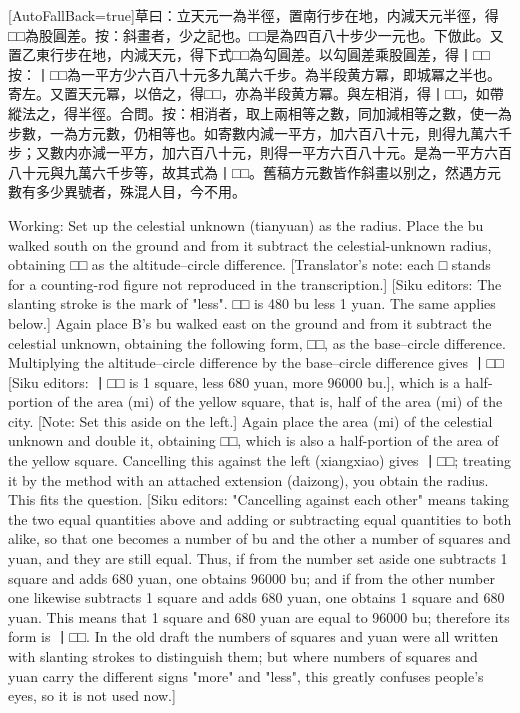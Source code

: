 \documentclass[11pt]{article}
\newcommand{\zhsmall}{\footnotesize\color{black!70}}
\newcommand{\unitlabel}[1]{\marginpar{\raggedleft\tiny\color{gray}#1}}
\newenvironment{unitzh}{\par\CJKfontspec{Noto Serif CJK SC}[AutoFallBack=true]\large\linespread{1.25}\selectfont}{\par}
\newenvironment{uniten}{\par\small\color{black!85}}{\par\medskip}
\begin{document}
\begin{unitzh}\unitlabel{ceyuan-007.13}草曰：立天元一為半徑，置南行步在地，内減天元半徑，得□□為股圓差。{\zhsmall 按：斜畫者，少之記也。□□是為四百八十步少一元也。下倣此。}又置乙東行步在地，内減天元，得下式□□為勾圓差。以勾圓差乘股圓差，得丨□□{\zhsmall 按：丨□□為一平方少六百八十元多九萬六千步。}為半段黄方冪，即城冪之半也。{\zhsmall 寄左。}又置天元冪，以倍之，得□□，亦為半段黄方冪。與左相消，得丨□□，如帶縱法之，得半徑。合問。{\zhsmall 按：相消者，取上兩相等之數，同加減相等之數，使一為步數，一為方元數，仍相等也。如寄數内減一平方，加六百八十元，則得九萬六千步；又數内亦減一平方，加六百八十元，則得一平方六百八十元。是為一平方六百八十元與九萬六千步等，故其式為丨□□。舊稿方元數皆作斜畫以别之，然遇方元數有多少異號者，殊混人目，今不用。}\end{unitzh}
\begin{uniten}Working: Set up the celestial unknown (tianyuan) as the radius. Place the bu walked south on the ground and from it subtract the celestial-unknown radius, obtaining □□ as the altitude–circle difference. [Translator's note: each □ stands for a counting-rod figure not reproduced in the transcription.] [Siku editors: The slanting stroke is the mark of "less". □□ is 480 bu less 1 yuan. The same applies below.] Again place B's bu walked east on the ground and from it subtract the celestial unknown, obtaining the following form, □□, as the base–circle difference. Multiplying the altitude–circle difference by the base–circle difference gives 丨□□ [Siku editors: 丨□□ is 1 square, less 680 yuan, more 96000 bu.], which is a half-portion of the area (mi) of the yellow square, that is, half of the area (mi) of the city. [Note: Set this aside on the left.] Again place the area (mi) of the celestial unknown and double it, obtaining □□, which is also a half-portion of the area of the yellow square. Cancelling this against the left (xiangxiao) gives 丨□□; treating it by the method with an attached extension (daizong), you obtain the radius. This fits the question. [Siku editors: "Cancelling against each other" means taking the two equal quantities above and adding or subtracting equal quantities to both alike, so that one becomes a number of bu and the other a number of squares and yuan, and they are still equal. Thus, if from the number set aside one subtracts 1 square and adds 680 yuan, one obtains 96000 bu; and if from the other number one likewise subtracts 1 square and adds 680 yuan, one obtains 1 square and 680 yuan. This means that 1 square and 680 yuan are equal to 96000 bu; therefore its form is 丨□□. In the old draft the numbers of squares and yuan were all written with slanting strokes to distinguish them; but where numbers of squares and yuan carry the different signs "more" and "less", this greatly confuses people's eyes, so it is not used now.]\end{uniten}
\end{document}
